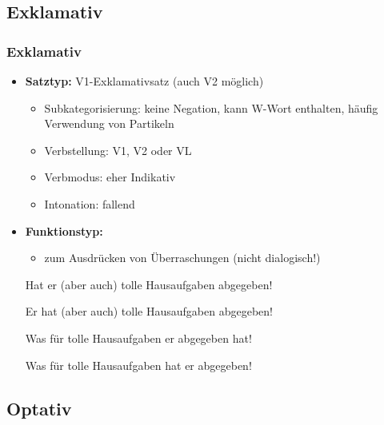 \subsection{Exklamativ}


\begin{frame}
\frametitle{Exklamativ}

\begin{itemize}
	\item \textbf{Satztyp:} V1-Exklamativsatz (auch V2 möglich)
	\begin{itemize}
		\item Subkategorisierung: keine Negation, kann W-Wort enthalten, häufig Verwendung von Partikeln
		\item Verbstellung: V1, V2 oder VL
		\item Verbmodus: eher Indikativ
		\item Intonation: fallend
	\end{itemize}
	\item \textbf{Funktionstyp:}
	\begin{itemize}
		\item zum Ausdrücken von Überraschungen (nicht dialogisch!)
	\end{itemize}
	
	\ea Hat er (aber auch) tolle Hausaufgaben abgegeben!
	\z
	
	\ea Er hat (aber auch) tolle Hausaufgaben abgegeben!
	\z
	
	\ea Was für tolle Hausaufgaben er abgegeben hat!
	\z

	\ea Was für tolle Hausaufgaben hat er abgegeben!
	\z
		
\end{itemize}

\end{frame}


\subsection{Optativ}


